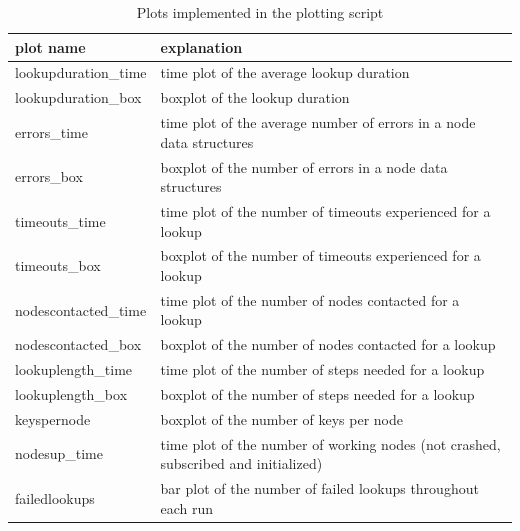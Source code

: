 \documentclass[11pt,twocolumn,letterpaper]{article}
\begin{document}
		\begin{table}[!h]
			\caption{Plots implemented in the plotting script}
			\label{tab:plots}
			\centering
			\begin{tabular}{C{0.4\columnwidth}L{0.6\columnwidth}}
				\hline
				\textbf{plot name}&\textbf{explanation}\\
				\hline
				lookupduration\_time&time plot of the average lookup duration\\
				\hline
				lookupduration\_box&boxplot of the lookup duration\\
				\hline
				errors\_time&time plot of the average number of errors in a node data structures\\
				\hline
				errors\_box&boxplot of the number of errors in a node data structures\\
				\hline
				timeouts\_time&time plot of the number of timeouts experienced for a lookup\\
				\hline
				timeouts\_box&boxplot of the number of timeouts experienced for a lookup\\
				\hline
				nodescontacted\_time&time plot of the number of nodes contacted for a lookup\\
				\hline
				nodescontacted\_box&boxplot of the number of nodes contacted for a lookup\\
				\hline
				lookuplength\_time&time plot of the number of steps needed for a lookup\\
				\hline
				lookuplength\_box&boxplot of the number of steps needed for a lookup\\
				\hline
				keyspernode&boxplot of the number of keys per node\\
				\hline
				nodesup\_time&time plot of the number of working nodes (not crashed, subscribed and initialized)\\
				\hline
				failedlookups&bar plot of the number of failed lookups throughout each run\\
				\hline
			\end{tabular}
		\end{table}

	\clearpage
	\printbibliography
\end{document}
